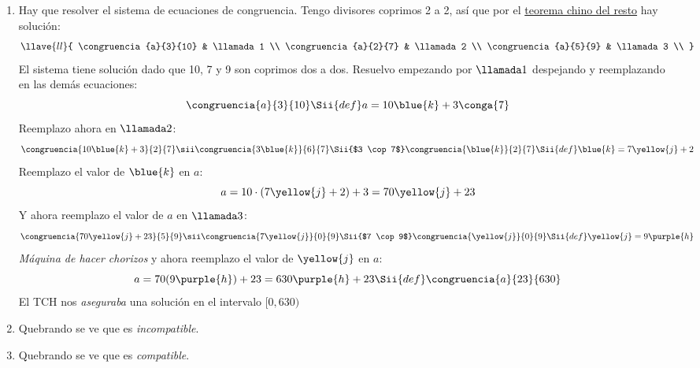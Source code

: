 \begin{enumerate}[label=\roman*)]
  \item Hay que resolver el sistema de ecuaciones de congruencia. Tengo
        divisores coprimos 2 a 2, así que por el \href{\chinito}{teorema
          chino del resto} hay solución:
        $$
          \llave{ll}{
            \congruencia{a}{3}{10} & \llamada1 \\
            \congruencia{a}{2}{7}  & \llamada2 \\
            \congruencia{a}{5}{9}  & \llamada3 \\
          }
        $$
        El sistema tiene solución dado que 10, 7 y 9 son coprimos dos a dos. Resuelvo empezando por $\llamada1$ despejando
        y reemplazando en las demás ecuaciones:
        $$
          \congruencia{a}{3}{10}
          \Sii{def}
          a = 10\blue{k} + 3 \conga{7}
        $$
        Reemplazo ahora en $\llamada2$:
        $$
          \congruencia{10 \blue{k} +3}{2}{7}
          \sii
          \congruencia{3\blue{k}}{6}{7}
          \Sii{$3 \cop 7$}
          \congruencia{\blue{k}}{2}{7}
          \Sii{def}
          \blue{k} = 7\yellow{j} + 2
        $$
        Reemplazo el valor de $\blue{k}$ en $a$:
        $$
          a = 10 \cdot ( 7\yellow{j} + 2) + 3 = 70 \yellow{j} + 23
        $$
        Y ahora reemplazo el valor de $a$ en $\llamada3$:
        $$
          \congruencia{70 \yellow{j} + 23}{5}{9}
          \sii
          \congruencia{7 \yellow{j}}{0}{9}
          \Sii{$7 \cop 9$}
          \congruencia{\yellow{j}}{0}{9}
          \Sii{def}
          \yellow{j} = 9\purple{h}
        $$
        \textit{Máquina de hacer chorizos}
        y ahora reemplazo el valor de $\yellow{j}$ en $a$:
        $$
          a = 70(9\purple{h}) + 23 = 630 \purple{h} + 23
          \Sii{def}
          \congruencia{a}{23}{630}
        $$
                El TCH nos \textit{aseguraba} una solución en el 
                intervalo $[0, 630)$ \Tilde

        \item Quebrando se ve que es \textit{incompatible}. 

        \item Quebrando se ve que es \textit{compatible}. 
\end{enumerate}
